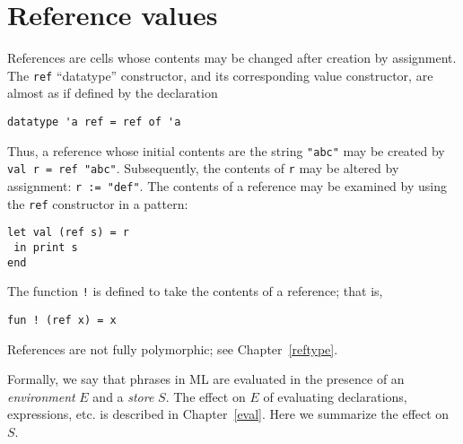 \chapter{Reference values}
\label{reference}
References are cells whose contents may be changed after creation by
assignment.  The \verb"ref" ``datatype'' constructor, and its
corresponding value constructor, are almost as if defined by the declaration
\begin{verbatim}
datatype 'a ref = ref of 'a
\end{verbatim}
Thus, a reference whose initial contents are the string \verb|"abc"|
may be created by \verb|val r = ref "abc"|.  Subsequently, the
contents of \verb"r" may be altered by assignment: \verb|r := "def"|.
The contents of a reference may be examined by using the \verb"ref"
constructor in a pattern:
\begin{verbatim}
let val (ref s) = r
 in print s
end
\end{verbatim}
The function \verb"!" is defined to take the contents of a reference;
that is,
\begin{verbatim}
fun ! (ref x) = x
\end{verbatim}

References are not fully polymorphic; see Chapter~\ref{reftype}.

Formally, we say that phrases in ML are evaluated in the presence of
an {\em environment} $E$ and a {\em store} $S$.  The effect on $E$ of
evaluating declarations, expressions, etc.  is described in
Chapter~\ref{eval}.  Here we summarize the effect on $S$.

